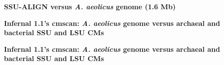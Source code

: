 \documentclass[landscape]{slides}
\begin{document}
\begin{slide}
\begin{center}
\small
\textbf{SSU-ALIGN versus \emph{A. aeolicus} genome (1.6 Mb)}
\end{center}


\vfill
\end{slide}
\begin{slide}
\begin{center}
\small
\textbf{Infernal 1.1's cmscan: \emph{A. aeolicus} genome versus archaeal and
bacterial SSU and LSU CMs}
\end{center}




\vfill
\end{slide}
\begin{slide}
\begin{center}
\small
\textbf{Infernal 1.1's cmscan: \emph{A. aeolicus} genome versus archaeal and
bacterial SSU and LSU CMs}
\end{center}


\vfill
\end{slide}
\end{document}
